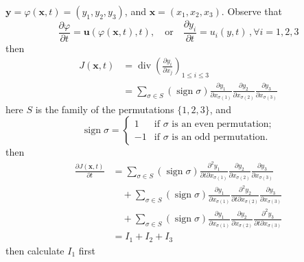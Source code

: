 $\textbf{y} = \varphi(\textbf{x},t) = (y_1,y_2,y_3)$, and $\textbf{x}=(x_1,x_2,x_3)$. Observe that 
\begin{equation}
\frac{\partial \varphi}{\partial t} = \textbf{u}(\varphi(\textbf{x},t),t),
\quad\text{or}\quad
\frac{\partial y_i}{\partial t} = u_i(y,t)\,,\forall i=1,2,3
\end{equation}
then
\begin{equation}
\begin{aligned}
J(\textbf{x},t)
&= \operatorname{div}\left(\frac{\partial y_i}{\partial x_j}\right)_{1\leq i\leq 3}\\
&= \sum_{\sigma\in S} \left(\operatorname{sign} \sigma\right) \frac{\partial y_1}{\partial x_{\sigma(1)}}\frac{\partial y_2}{\partial x_{\sigma(2)}}\frac{\partial y_3}{\partial x_{\sigma(3)}}
\end{aligned}
\end{equation}
here $S$ is the family of the permutations $\{1,2,3\}$, and 
\begin{equation}
\operatorname{sign} \sigma = \begin{cases}
1 & \text{if $\sigma$ is an even permutation;}\\
-1 & \text{if $\sigma$ is an odd permutation.}
\end{cases}
\end{equation}
then 
\begin{equation}
\begin{aligned}
\frac{\partial J(\textbf{x},t)}{\partial t}
&= \sum_{\sigma\in S} \left(\operatorname{sign} \sigma\right)
\frac{\partial^2 y_1}{\partial t\partial x_{\sigma(1)}}
\frac{\partial y_2}{\partial x_{\sigma(2)}}
\frac{\partial y_3}{\partial x_{\sigma(3)}}\\
&\quad + \sum_{\sigma\in S} \left(\operatorname{sign} \sigma\right)
\frac{\partial y_1}{\partial x_{\sigma(1)}}
\frac{\partial^2 y_2}{\partial t\partial x_{\sigma(2)}}
\frac{\partial y_3}{\partial x_{\sigma(3)}}\\
&\quad + \sum_{\sigma\in S} \left(\operatorname{sign} \sigma\right)
\frac{\partial y_1}{\partial x_{\sigma(1)}}
\frac{\partial y_2}{\partial x_{\sigma(2)}}
\frac{\partial^2 y_3}{\partial t\partial x_{\sigma(3)}}\\
&= I_1 + I_2 + I_3
\end{aligned}
\end{equation}
then calculate $I_1$ first
